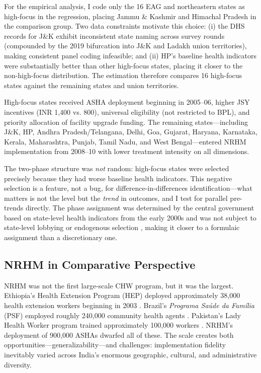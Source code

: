 \documentclass[12pt]{article}
\begin{document}
For the empirical analysis, I code only the 16 EAG and northeastern states as high-focus in the regression, placing Jammu \& Kashmir and Himachal Pradesh in the comparison group. Two data constraints motivate this choice: (i) the DHS records for J\&K exhibit inconsistent state naming across survey rounds (compounded by the 2019 bifurcation into J\&K and Ladakh union territories), making consistent panel coding infeasible; and (ii) HP's baseline health indicators were substantially better than other high-focus states, placing it closer to the non-high-focus distribution. The estimation therefore compares 16 high-focus states against the remaining states and union territories.

High-focus states received ASHA deployment beginning in 2005--06, higher JSY incentives (INR 1,400 vs. 800), universal eligibility (not restricted to BPL), and priority allocation of facility upgrade funding. The remaining states---including J\&K, HP, Andhra Pradesh/Telangana, Delhi, Goa, Gujarat, Haryana, Karnataka, Kerala, Maharashtra, Punjab, Tamil Nadu, and West Bengal---entered NRHM implementation from 2008--10 with lower treatment intensity on all dimensions.

The two-phase structure was \emph{not} random: high-focus states were selected precisely because they had worse baseline health indicators. This negative selection is a feature, not a bug, for difference-in-differences identification---what matters is not the level but the \emph{trend} in outcomes, and I test for parallel pre-trends directly. The phase assignment was determined by the central government based on state-level health indicators from the early 2000s and was not subject to state-level lobbying or endogenous selection \citep{rao2016asha}, making it closer to a formulaic assignment than a discretionary one.

\subsection{NRHM in Comparative Perspective}

NRHM was not the first large-scale CHW program, but it was the largest. Ethiopia's Health Extension Program (HEP) deployed approximately 38,000 health extension workers beginning in 2003 \citep{workneh2013health}. Brazil's \emph{Programa Sa\'{u}de da Fam\'{i}lia} (PSF) employed roughly 240,000 community health agents \citep{macinko2006evaluation}. Pakistan's Lady Health Worker program trained approximately 100,000 workers \citep{bhutta2011alma}. NRHM's deployment of 900,000 ASHAs dwarfed all of these. The scale creates both opportunities---generalizability---and challenges: implementation fidelity inevitably varied across India's enormous geographic, cultural, and administrative diversity.
\end{document}
